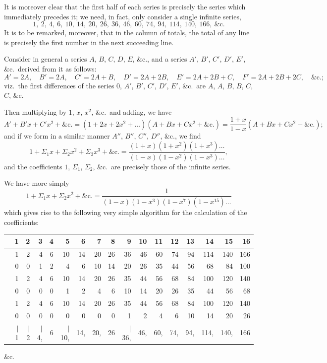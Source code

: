 \documentclass[11pt,a4paper]{article}
\theoremstyle{plain}
\begin{document}
It is moreover clear that the first half of each series is precisely the series which immediately precedes it; we need, in fact, only consider a single infinite series,
\[
1,\ 2,\ 4,\ 6,\ 10,\ 14,\ 20,\ 26,\ 36,\ 46,\ 60,\ 74,\ 94,\ 114,\ 140,\ 166,\ \&\text{c.}
\]
It is to be remarked, moreover, that in the column of totals, the total of any line is precisely the first number in the next succeeding line.

Consider in general a series $A$, $B$, $C$, $D$, $E$, \&c., and a series $A'$, $B'$, $C'$, $D'$, $E'$, \&c.\ derived from it as follows:
\[
A' = 2A, \quad B' = 2A, \quad C' = 2A + B, \quad D' = 2A + 2B, \quad E' = 2A + 2B + C, \quad F' = 2A + 2B + 2C, \quad \&\text{c.};
\]
viz.\ the first differences of the series $0$, $A'$, $B'$, $C'$, $D'$, $E'$, \&c.\ are $A$, $A$, $B$, $B$, $C$, $C$, \&c.

Then multiplying by $1$, $x$, $x^2$, \&c.\ and adding, we have
\[
A' + B'x + C'x^2 + \&\text{c.} = (1 + 2x + 2x^2 + \ldots)(A + Bx + Cx^2 + \&\text{c.}) = \frac{1+x}{1-x}(A + Bx + Cx^2 + \&\text{c.});
\]
and if we form in a similar manner $A''$, $B''$, $C''$, $D''$, \&c., we find
\[
1 + \Sigma_1 x + \Sigma_2 x^2 + \Sigma_3 x^3 + \&\text{c.} = \frac{(1+x)(1+x^2)(1+x^3)\ldots}{(1-x)(1-x^2)(1-x^3)\ldots},
\]
and the coefficients $1$, $\Sigma_1$, $\Sigma_2$, \&c.\ are precisely those of the infinite series.

We have more simply
\[
1 + \Sigma_1 x + \Sigma_2 x^2 + \&\text{c.} = \frac{1}{(1-x)(1-x^3)(1-x^7)(1-x^{15})\ldots}
\]
which gives rise to the following very simple algorithm for the calculation of the coefficients:
\begin{center}
\begin{tabular}{r|rrrrrrrrrrrrrrrr}
& 1 & 2 & 3 & 4 & 5 & 6 & 7 & 8 & 9 & 10 & 11 & 12 & 13 & 14 & 15 & 16 \\
\hline
& 1 & 2 & 4 & 6 & 10 & 14 & 20 & 26 & 36 & 46 & 60 & 74 & 94 & 114 & 140 & 166 \\
& 0 & 0 & 1 & 2 & 4 & 6 & 10 & 14 & 20 & 26 & 35 & 44 & 56 & 68 & 84 & 100 \\
& 1 & 2 & 4 & 6 & 10 & 14 & 20 & 26 & 35 & 44 & 56 & 68 & 84 & 100 & 120 & 140 \\
& 0 & 0 & 0 & 0 & 1 & 2 & 4 & 6 & 10 & 14 & 20 & 26 & 35 & 44 & 56 & 68 \\
& 1 & 2 & 4 & 6 & 10 & 14 & 20 & 26 & 35 & 44 & 56 & 68 & 84 & 100 & 120 & 140 \\
& 0 & 0 & 0 & 0 & 0 & 0 & 0 & 0 & 1 & 2 & 4 & 6 & 10 & 14 & 20 & 26 \\
\hline
& $|$ 1 & $|$ 2 & $|$ 4, & 6 & $|$ 10, & 14, & 20, & 26 & $|$ 36, & 46, & 60, & 74, & 94, & 114, & 140, & 166 \\
\end{tabular}
\end{center}
\&c.
\end{document}
